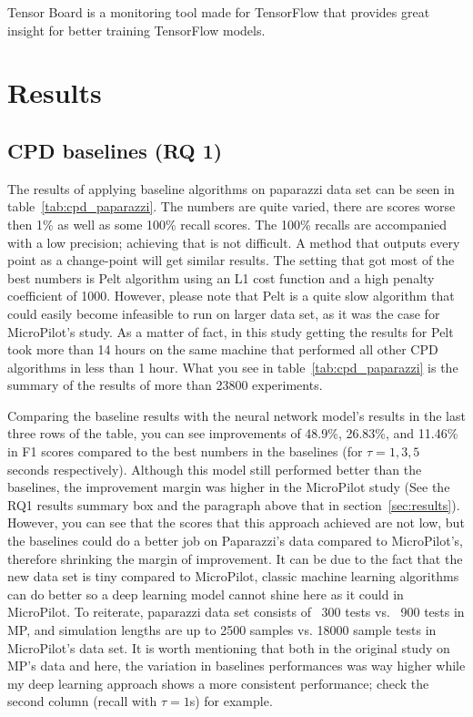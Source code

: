 Tensor Board is a monitoring tool made for TensorFlow \cite{tensorflow2015-whitepaper} that provides great insight for better training TensorFlow models.

\section{Results}
\subsection{CPD baselines (RQ 1)}

The results of applying baseline algorithms on paparazzi data set can be seen in table~\ref{tab:cpd_paparazzi}.
The numbers are quite varied, there are scores worse then 1\% as well as some 100\% recall scores. The 100\% recalls are accompanied with a low precision; achieving that is not difficult. A method that outputs every point as a change-point will get similar results. The setting that got most of the best numbers is Pelt algorithm using an L1 cost function and a high penalty coefficient of 1000. However, please note that Pelt is a quite slow algorithm that could easily become infeasible to run on larger data set, as it was the case for MicroPilot's study. As a matter of fact, in this study getting the results for Pelt took more than 14 hours on the same machine that performed all other CPD algorithms in less than 1 hour. What you see in table~\ref{tab:cpd_paparazzi} is the summary of the results of more than 23800 experiments. 

Comparing the baseline results with the neural network model's results in the last three rows of the table, you can see improvements of 48.9\%, 26.83\%, and 11.46\% in F1 scores compared to the best numbers in the baselines (for $\tau = 1, 3, 5$ seconds respectively). Although this model still performed better than the baselines, the improvement margin was higher in the MicroPilot study (See the RQ1 results summary box and the paragraph above that in section~\ref{sec:results}). However, you can see that the scores that this approach achieved are not low, but the baselines could do a better job on Paparazzi's data compared to MicroPilot's, therefore shrinking the margin of improvement. It can be due to the fact that the new data set is tiny compared to MicroPilot, classic machine learning algorithms can do better so a deep learning model cannot shine here as it could in MicroPilot. To reiterate, paparazzi data set consists of ~300 tests vs. ~900 tests in MP, and simulation lengths are up to 2500 samples vs. 18000 sample tests in MicroPilot's data set. It is worth mentioning that both in the original study on MP's data and here, the variation in baselines performances was way higher while my deep learning approach shows a more consistent performance; check the second column (recall with $\tau=1$s) for example. 

